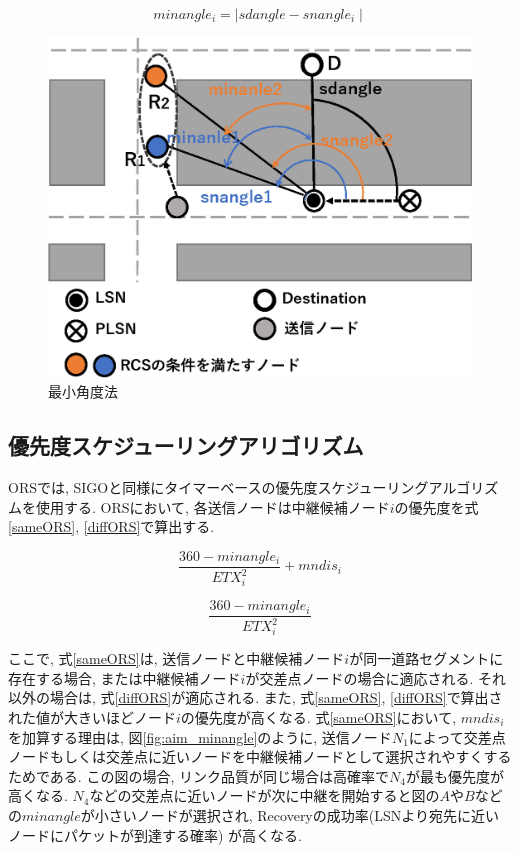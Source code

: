 \documentclass[10pt]{jreport}
\begin{document}
\begin{equation}
	\label{minangle}
	minangle_i = \mid sdangle - snangle_i \mid
\end{equation}

\begin{figure}[!ht]
	\centering
	\includegraphics[width=130mm]{figures/minangle.eps}
	\caption{最小角度法}
	\label{fig:minangle}
\end{figure}


\subsection{優先度スケジューリングアリゴリズム}
\label{ORS_priority}

ORSでは, SIGOと同様にタイマーベースの優先度スケジューリングアルゴリズムを使用する. ORSにおいて, 各送信ノードは中継候補ノード$i$の優先度を式\ref{sameORS}, \ref{diffORS}で算出する. 

\begin{equation}
	\label{sameORS}
	\frac{360 - minangle_i}{ETX_{i}^{2}} + mndis_i
\end{equation}

\begin{equation}
	\label{diffORS}
	\frac{360 - minangle_i}{ETX_{i}^{2}} 
\end{equation}

ここで, 式\ref{sameORS}は, 送信ノードと中継候補ノード$i$が同一道路セグメントに存在する場合, または中継候補ノード$i$が交差点ノードの場合に適応される. それ以外の場合は, 式\ref{diffORS}が適応される.
また, 式\ref{sameORS}, \ref{diffORS}で算出された値が大きいほどノード$i$の優先度が高くなる.
式\ref{sameORS}において, $mndis_i$を加算する理由は, 図\ref{fig:aim_minangle}のように, 送信ノード$N_1$によって交差点ノードもしくは交差点に近いノードを中継候補ノードとして選択されやすくするためである. この図の場合, リンク品質が同じ場合は高確率で$N_4$が最も優先度が高くなる. $N_4$などの交差点に近いノードが次に中継を開始すると図の$A$や$B$などの$minangle$が小さいノードが選択され, Recoveryの成功率(LSNより宛先に近いノードにパケットが到達する確率) が高くなる. 
\end{document}

